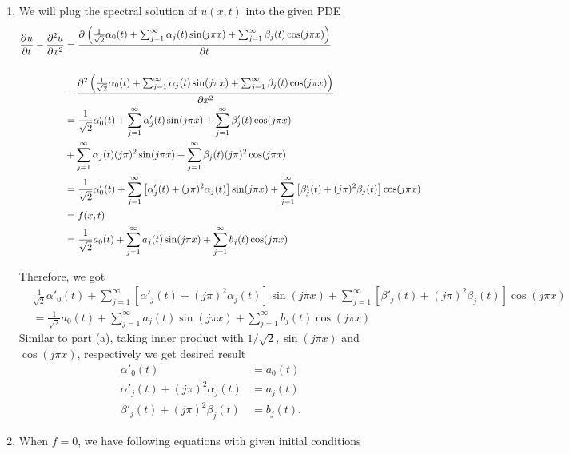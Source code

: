{\begin{solution}
\begin{enumerate}
\[
\beta_j(0) =  \ip{\psi(x), \cos(j\pi x)} = \int_{-1}^1\psi(x) \cos(j\pi x) dx.
\]
\item We will plug the spectral solution of $u(x,t)$ into the given PDE
\begin{align*}
\frac{\partial^{} u}{\partial t^{}} - \frac{\partial^{2} u}{\partial x^{2}} &= \frac{\partial^{} \left(\frac{1}{\sqrt{2}}\alpha_0(t) + \sum_{j=1}^\infty \alpha_j(t)\sin(j\pi x) + \sum_{j=1}^\infty \beta_j(t)\cos(j\pi x)\right)}{\partial t^{}} \\\\
                           & - \frac{\partial^{2} \left(\frac{1}{\sqrt{2}}\alpha_0(t) + \sum_{j=1}^\infty \alpha_j(t)\sin(j\pi x) + \sum_{j=1}^\infty \beta_j(t)\cos(j\pi x)\right)}{\partial x^{2}} \\
&= \frac{1}{\sqrt{2}}\alpha'_0(t) + \sum_{j=1}^\infty \alpha'_j(t)\sin(j\pi x) + \sum_{j=1}^\infty \beta'_j(t)\cos(j\pi x) \\
&+ \sum_{j=1}^\infty \alpha_j(t) (j\pi)^2 \sin(j\pi x) + \sum_{j=1}^\infty \beta_j(t) (j\pi)^2\cos(j\pi x) \\
&= \frac{1}{\sqrt{2}}\alpha'_0(t) + \sum_{j=1}^\infty \left[\alpha'_j(t) + (j\pi)^2  \alpha_j(t)\right]\sin(j\pi x) + \sum_{j=1}^\infty \left[\beta'_j(t) + (j\pi)^2  \beta_j(t)\right]\cos(j\pi x)\\
&= f(x,t) \\
&=\frac{1}{\sqrt{2}} a_0(t) + \sum_{j=1}^\infty a_j(t)\sin(j\pi x) + \sum_{j=1}^\infty b_j(t)\cos(j\pi x)
\end{align*}

Therefore, we got
\begin{align*}
&\frac{1}{\sqrt{2}}\alpha'_0(t) + \sum_{j=1}^\infty \left[\alpha'_j(t) + (j\pi)^2  \alpha_j(t)\right]\sin(j\pi x) + \sum_{j=1}^\infty \left[\beta'_j(t) + (j\pi)^2  \beta_j(t)\right]\cos(j\pi x)\\
&=\frac{1}{\sqrt{2}} a_0(t) + \sum_{j=1}^\infty a_j(t)\sin(j\pi x) + \sum_{j=1}^\infty b_j(t)\cos(j\pi x)
\end{align*}
Similar to part (a), taking inner product with $1/\sqrt{2}, \sin(j\pi x)$ and  $\cos(j\pi x)$, respectively we get desired result
\begin{align*}
\alpha'_0(t) &= a_0(t)\\
\alpha'_j(t) + (j\pi)^2  \alpha_j(t) &= a_j(t)\\
\beta'_j(t) + (j\pi)^2  \beta_j(t) &= b_j(t).
\end{align*}

\item When $f=0$, we have following equations with given initial conditions 


\end{enumerate}
\end{solution}}
